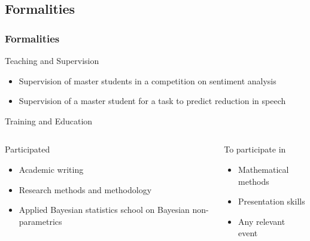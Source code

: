\documentclass{beamer}
\begin{document}
\begin{frame}\section{Formalities}
    \frametitle{Formalities}

    \begin{block}{Teaching and Supervision}
        \begin{itemize}
            \item Supervision of master students in a competition on sentiment analysis
            \item Supervision of a master student for a task to predict reduction in speech
        \end{itemize}
    \end{block}

    \begin{block}{Training and Education}
        \begin{columns}[T,totalwidth=\textwidth]
            \begin{column}{0.5\textwidth}
                \begin{block}{Participated}
                    \begin{itemize}
                        \item Academic writing
                        \item Research methods and methodology
                        \item Applied Bayesian statistics school on Bayesian non-parametrics
                    \end{itemize}
                \end{block}
            \end{column}    
            \begin{column}{0.5\textwidth}
                \begin{block}{To participate in}
                    \begin{itemize}
                        \item Mathematical methods
                        \item Presentation skills
                        \item Any relevant event
                    \end{itemize}
                \end{block}
            \end{column}    
        \end{columns}
    \end{block}
\end{frame}
\end{document}
